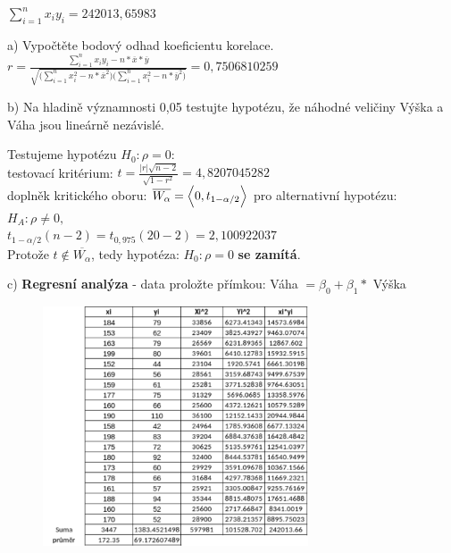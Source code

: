 \documentclass[11pt,a4paper]{article}
\newcommand\ddfrac[2]{\frac{\displaystyle #1}{\displaystyle #2}}
\begin{document}
$ \sum\limits_{i=1}^{n} x_i y_i = 242013,65983 $ \\

\noindent\makebox[\linewidth]{\rule{\textwidth}{0.4pt}}

a) Vypočtěte bodový odhad koeficientu korelace. \\

$ r = \ddfrac{\sum\limits_{i=1}^{n} x_i y_i - n * \overline{x} * \overline{y}}{\sqrt{\biggl( \sum\limits_{i=1}^{n} x_{i}^2 - n * \overline{x}^2 \biggr) \biggl( \sum\limits_{i=1}^n x_{i}^2 - n * \overline{y}^2 \biggr) } }  = 0,7506810259 $ \\

\noindent\makebox[\linewidth]{\rule{\textwidth}{0.4pt}}

b) Na hladině významnosti 0,05 testujte hypotézu, že náhodné veličiny Výška a Váha jsou lineárně
nezávislé.

Testujeme hypotézu $ H_0 : \rho = 0 : $ \\

testovací kritérium: $ t = \ddfrac{|r|\sqrt{n - 2}}{\sqrt{1 - r^2}} = 4,8207045282 $ \\

doplněk kritického oboru: $ \overline{W_\alpha} = \Bigl< 0, t_{1-\alpha/2} \Bigr> $ pro alternativní hypotézu: $ H_A : \rho \ne 0, $ \\

$ t_{1-\alpha/2}(n - 2) = t_{0,975} (20 - 2) = 2,100922037 $ \\

Protože $ t \notin \overline{W_\alpha} $, tedy hypotéza: $ H_0 : \rho = 0 $ \textbf{se zamítá}. \\

\noindent\makebox[\linewidth]{\rule{\textwidth}{0.4pt}}

c) \textbf{Regresní analýza} - data proložte přímkou: Váha $= \beta_0 + \beta_1 * $ Výška \\

\begin{figure}[H]
    \centering
    \includegraphics[width=0.70\textwidth]{img/1ctable.pdf}
\end{figure}
\end{document}

